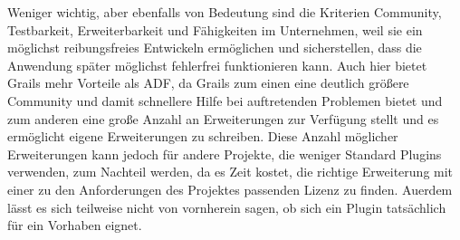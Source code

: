 Weniger wichtig, aber ebenfalls von Bedeutung sind die Kriterien Community, Testbarkeit, Erweiterbarkeit und Fähigkeiten im Unternehmen, weil sie ein möglichst reibungsfreies Entwickeln ermöglichen und sicherstellen, dass die Anwendung später möglichst fehlerfrei funktionieren kann. Auch hier bietet Grails mehr Vorteile als ADF, da Grails zum einen eine deutlich größere Community und damit schnellere Hilfe bei auftretenden Problemen bietet und zum anderen eine große Anzahl an Erweiterungen zur Verfügung stellt und es ermöglicht eigene Erweiterungen zu schreiben. Diese Anzahl möglicher Erweiterungen kann jedoch für andere Projekte, die weniger Standard Plugins verwenden, zum Nachteil werden, da es Zeit kostet, die richtige Erweiterung mit einer zu den Anforderungen des Projektes passenden Lizenz zu finden. Auerdem lässt es sich teilweise nicht von vornherein sagen, ob sich ein Plugin tatsächlich für ein Vorhaben eignet.\\

